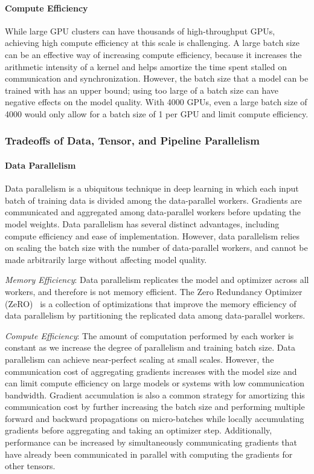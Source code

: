 \documentclass[11pt]{article}
\begin{document}
\paragraph{Compute Efficiency} While large GPU clusters can have thousands of high-throughput
GPUs, achieving high compute efficiency at this scale is challenging. A large batch
size can be an effective way of increasing compute efficiency, because it increases the arithmetic
intensity of a kernel and helps amortize the time spent stalled on communication and synchronization.
However, the batch size that a model can be
trained with has an upper bound; using too large of a batch size can have
negative effects on the model quality. With 4000 GPUs, even a large batch
size of 4000 would only allow for a batch size of 1 per GPU and limit
compute efficiency.


\subsubsection{Tradeoffs of Data, Tensor, and Pipeline Parallelism}

\paragraph{Data Parallelism}
Data parallelism is a ubiquitous technique in deep learning in which
each input batch of training data is divided among the data-parallel workers.
Gradients are communicated and aggregated among data-parallel workers before
updating the model weights.
Data parallelism has
several distinct advantages, including compute efficiency and ease of implementation. However, data parallelism relies on scaling the batch
size with the number of data-parallel workers, and cannot be made arbitrarily
large without affecting model quality.

\textit{Memory Efficiency}: Data parallelism replicates the model and optimizer
across all workers, and therefore is not memory efficient.
The Zero Redundancy Optimizer (ZeRO)~\cite{rajbhandari2020zero} is a collection
of optimizations that improve the memory efficiency of data parallelism by 
partitioning the replicated data among data-parallel workers.

\textit{Compute Efficiency}: The amount of computation performed by each worker
is constant as we increase the degree of parallelism and training batch size.
Data parallelism can achieve near-perfect scaling at small scales.
However, the communication cost of
aggregating gradients increases with the model size and
can limit compute efficiency on large models or systems with low communication
bandwidth.
Gradient accumulation is also a common strategy for amortizing this
communication cost by further increasing the batch size and performing multiple
forward and backward propagations on micro-batches while locally accumulating
gradients before aggregating and taking an optimizer step. Additionally,
performance can be increased by simultaneously communicating gradients that have
already been communicated in parallel with computing the gradients for other tensors.
\end{document}
